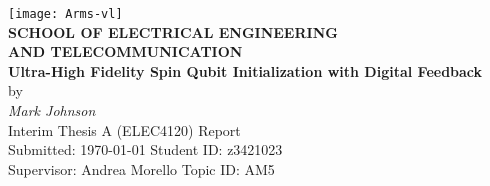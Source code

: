 \begin{center}
	\centering\texttt{[image: Arms-vl]}\\
	[0.5cm]
\textbf{\large SCHOOL OF ELECTRICAL ENGINEERING\\
AND TELECOMMUNICATION}\\[2cm]
{\addtolength{\baselineskip}{0.5cm}
\textbf{\Huge
Ultra-High Fidelity Spin Qubit Initialization with Digital Feedback} \\[0.5cm]
}
{\Large by}\\[0.5cm]
\textit{\huge
Mark Johnson} \\[1.5cm]
{\Large
Interim Thesis A (ELEC4120) Report\\[2ex]
\vfill
Submitted: \today\hfill
Student ID: z3421023\\[-1.0ex]
Supervisor: Andrea Morello\hfill
Topic ID: AM5\\
\vspace*{-1cm}
}
\end{center}